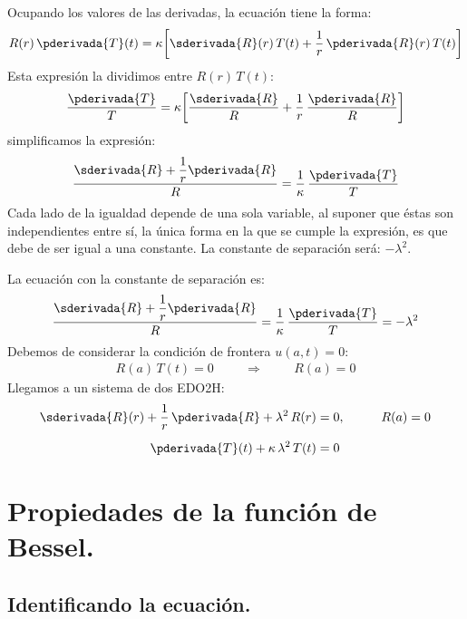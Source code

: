 Ocupando los valores de las derivadas, la ecuación tiene la forma:
\begin{align*}
R(r) \, \pderivada{T}(t) = \kappa \bigg[ \sderivada{R}(r) \, {T}(t) + \dfrac{1}{r} \, \pderivada{R}(r) \, {T}(t) \bigg]
\end{align*}
Esta expresión la dividimos entre $R(r) \, T(t)$:
\begin{align*}
\dfrac{\pderivada{T}}{T} = \kappa \bigg[ \dfrac{\sderivada{R}}{R} + \dfrac{1}{r} \, \dfrac{\pderivada{R}}{R} \bigg]
\end{align*}
simplificamos la expresión:
\begin{align*}
\dfrac{\sderivada{R} + \dfrac{1}{r} \pderivada{R}}{R} = \dfrac{1}{\kappa} \, \dfrac{\pderivada{T}}{T}
\end{align*}
Cada lado de la igualdad depende de una sola variable, al suponer que éstas son independientes entre sí, la única forma en la que se cumple la expresión, es que debe de ser igual a una constante. La constante de separación será: $-\lambda^{2}$.
\par
La ecuación con la constante de separación es:
\begin{align*}
\dfrac{\sderivada{R} + \dfrac{1}{r} \pderivada{R}}{R} = \dfrac{1}{\kappa} \, \dfrac{\pderivada{T}}{T} = -\lambda^{2}
\end{align*}
Debemos de considerar la condición de frontera $u(a, t) = 0$:
\begin{align*}
R(a) \, T(t) = 0 \hspace{1cm} \Rightarrow \hspace{1cm} R(a) = 0
\end{align*}
Llegamos a un sistema de dos EDO2H:
\begin{align}
\sderivada{R}(r) + \dfrac{1}{r} \, \pderivada{R} + \lambda^{2} \, R(r) &= 0, \hspace{1cm} R(a) = 0 \label{eq:ecuacion_CilBessel_03} \\[0.5em]  
\pderivada{T}(t) + \kappa \, \lambda^{2} \, T(t) &= 0 \label{eq:ecuacion_CilBessel_04}
\end{align}


\section{Propiedades de la función de Bessel.}
\subsection{Identificando la ecuación.}

